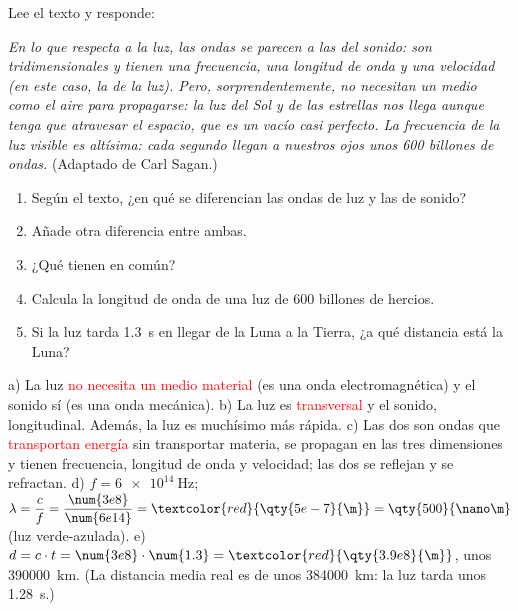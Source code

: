 \begin{exercise}
    Lee el texto y responde:
    \begin{marker}
        \emph{En lo que respecta a la luz, las ondas se parecen a las del sonido: son tridimensionales y tienen una frecuencia, una longitud de onda y una velocidad (en este caso, la de la luz). Pero, sorprendentemente, no necesitan un medio como el aire para propagarse: la luz del Sol y de las estrellas nos llega aunque tenga que atravesar el espacio, que es un vacío casi perfecto. La frecuencia de la luz visible es altísima: cada segundo llegan a nuestros ojos unos 600 billones de ondas.} (Adaptado de Carl Sagan.)
    \end{marker}
    \begin{enumerate}[label=\alph*)]
        \item Según el texto, ¿en qué se diferencian las ondas de luz y las de sonido?
        \item Añade otra diferencia entre ambas.
        \item ¿Qué tienen en común?
        \item Calcula la longitud de onda de una luz de 600 billones de hercios.
        \item Si la luz tarda \qty{1.3}{\s} en llegar de la Luna a la Tierra, ¿a qué distancia está la Luna?
    \end{enumerate}
    \begin{solu}
        a) La luz \textcolor{red}{no necesita un medio material} (es una onda electromagnética) y el sonido sí (es una onda mecánica).
        b) La luz es \textcolor{red}{transversal} y el sonido, longitudinal. Además, la luz es muchísimo más rápida.
        c) Las dos son ondas que \textcolor{red}{transportan energía} sin transportar materia, se propagan en las tres dimensiones y tienen frecuencia, longitud de onda y velocidad; las dos se reflejan y se refractan.
        d) \(f = \qty{6e14}{\hertz}\); \(\lambda = \dfrac{c}{f} = \dfrac{\num{3e8}}{\num{6e14}} = \textcolor{red}{\qty{5e-7}{\m}} = \qty{500}{\nano\m}\) (luz verde-azulada).
        e) \(d = c \cdot t = \num{3e8} \cdot \num{1.3} = \textcolor{red}{\qty{3.9e8}{\m}}\), unos \qty{390000}{\km}. (La distancia media real es de unos \qty{384000}{\km}: la luz tarda unos \qty{1.28}{\s}.)
    \end{solu}
\end{exercise}

